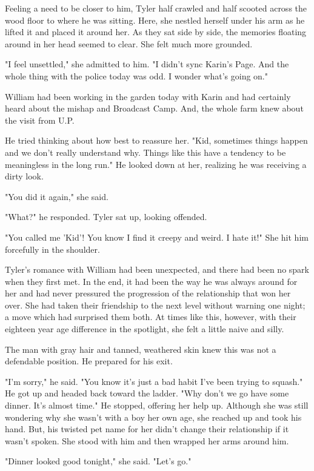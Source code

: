 \documentclass[courier]{sffms}
\begin{document}
Feeling a need to be closer to him, Tyler half crawled
and half scooted across the wood floor to where he
was sitting. Here, she nestled herself under his arm 
as he lifted it and placed it around her. As they
sat side by side, the memories floating around in her
head seemed to clear. She felt much more grounded.

"I feel unsettled," she admitted to him. "I didn't sync
Karin's Page. And the whole thing with the police
today was odd. I wonder what's going on."

William had been working in the garden today with
Karin and had certainly heard about the mishap and 
Broadcast Camp. And, the whole farm knew about the
visit from U.P.

He tried thinking about how best to reassure her.
"Kid, sometimes things happen and we don't really
understand why. Things like this have a tendency to
be meaningless in the long run." He looked down at
her, realizing he was receiving a dirty look.

"You did it again," she said.

"What?" he responded. Tyler sat up, looking offended.

"You called me 'Kid'! You know I find it creepy and
weird. I hate it!" She hit him forcefully in the shoulder.

Tyler's romance with William had been unexpected,
and there had been no spark when they first
met. In the end, it had been the way he was always
around for her and had never pressured the progression
of the relationship that won her over. She had taken
their friendship to the next level without warning one
night; a move which had surprised them both. At times
like this, however, with their eighteen year age difference
in the spotlight, she felt a little naive and silly.

The man with gray hair and tanned, weathered skin
knew this was not a defendable position. He prepared
for his exit.

"I'm sorry," he said. "You know it's just a bad habit I've been
trying to squash." He got up and headed back toward
the ladder. "Why don't we go have some dinner. It's almost
time." He stopped, offering her help up. Although she was
still wondering why she wasn't with a boy her own age,
she reached up and took his hand. But, his twisted pet
name for her didn't change their relationship if it wasn't 
spoken. She stood with him and then wrapped her arms
around him.

"Dinner looked good tonight," she said. "Let's go."
\end{document}
